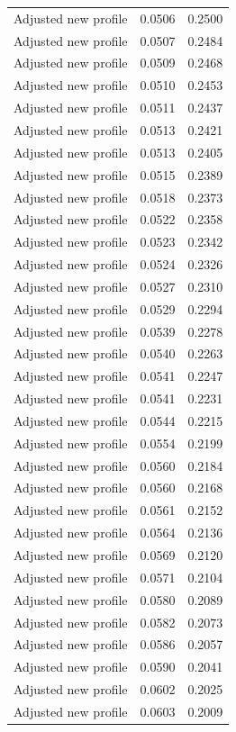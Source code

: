 \begin{table}[htbp]
\begin{tabular}{lll}
Adjusted new profile & 0.0506 & 0.2500 \\
Adjusted new profile & 0.0507 & 0.2484 \\
Adjusted new profile & 0.0509 & 0.2468 \\
Adjusted new profile & 0.0510 & 0.2453 \\
Adjusted new profile & 0.0511 & 0.2437 \\
Adjusted new profile & 0.0513 & 0.2421 \\
Adjusted new profile & 0.0513 & 0.2405 \\
Adjusted new profile & 0.0515 & 0.2389 \\
Adjusted new profile & 0.0518 & 0.2373 \\
Adjusted new profile & 0.0522 & 0.2358 \\
Adjusted new profile & 0.0523 & 0.2342 \\
Adjusted new profile & 0.0524 & 0.2326 \\
Adjusted new profile & 0.0527 & 0.2310 \\
Adjusted new profile & 0.0529 & 0.2294 \\
Adjusted new profile & 0.0539 & 0.2278 \\
Adjusted new profile & 0.0540 & 0.2263 \\
Adjusted new profile & 0.0541 & 0.2247 \\
Adjusted new profile & 0.0541 & 0.2231 \\
Adjusted new profile & 0.0544 & 0.2215 \\
Adjusted new profile & 0.0554 & 0.2199 \\
Adjusted new profile & 0.0560 & 0.2184 \\
Adjusted new profile & 0.0560 & 0.2168 \\
Adjusted new profile & 0.0561 & 0.2152 \\
Adjusted new profile & 0.0564 & 0.2136 \\
Adjusted new profile & 0.0569 & 0.2120 \\
Adjusted new profile & 0.0571 & 0.2104 \\
Adjusted new profile & 0.0580 & 0.2089 \\
Adjusted new profile & 0.0582 & 0.2073 \\
Adjusted new profile & 0.0586 & 0.2057 \\
Adjusted new profile & 0.0590 & 0.2041 \\
Adjusted new profile & 0.0602 & 0.2025 \\
Adjusted new profile & 0.0603 & 0.2009 \\

\end{tabular}
\end{table}

